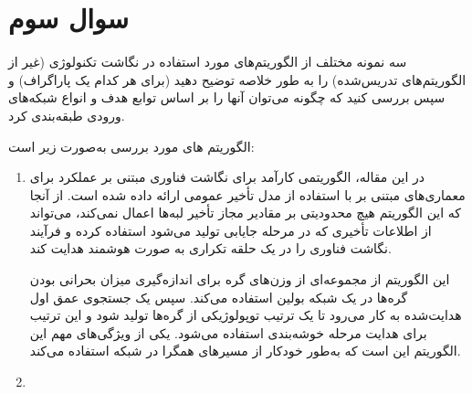 \section{سوال سوم}

سه نمونه مختلف از الگوریتم‌های مورد استفاده در نگاشت تکنولوژی  (غیر از الگوریتم‌های تدریس‌شده) را به طور خلاصه توضیح دهید (برای هر کدام یک پاراگراف) و سپس بررسی کنید که چگونه می‌توان آنها را بر اساس توابع هدف و انواع شبکه‌های ورودی طبقه‌بندی کرد.

\begin{qsolve}
	الگوریتم های مورد بررسی به‌صورت زیر است:
	
	\begin{enumerate}
		\item 
		\textbf{ \cite{ref1}}
		
		در این مقاله، الگوریتمی کارآمد برای نگاشت فناوری مبتنی بر عملکرد برای معماری‌های  مبتنی بر  با استفاده از مدل تأخیر عمومی ارائه داده شده است. از آنجا که این الگوریتم هیچ محدودیتی بر مقادیر مجاز تأخیر لبه‌ها اعمال نمی‌کند، می‌تواند از اطلاعات تأخیری که در مرحله جایابی تولید می‌شود استفاده کرده و فرآیند نگاشت فناوری را در یک حلقه تکراری به صورت هوشمند هدایت کند.
	
	این الگوریتم از مجموعه‌ای از وزن‌های گره برای اندازه‌گیری میزان بحرانی بودن گره‌ها در یک شبکه بولین استفاده می‌کند. سپس یک جستجوی عمق اول هدایت‌شده به کار می‌رود تا یک ترتیب توپولوژیکی از گره‌ها تولید شود و این ترتیب برای هدایت مرحله خوشه‌بندی استفاده می‌شود. یکی از ویژگی‌های مهم این الگوریتم این است که به‌طور خودکار از مسیرهای همگرا در شبکه استفاده می‌کند.
%		
%		
		
		
		\item 
		\textbf{ \cite{ref2}}
		

\end{enumerate}
\end{qsolve}
